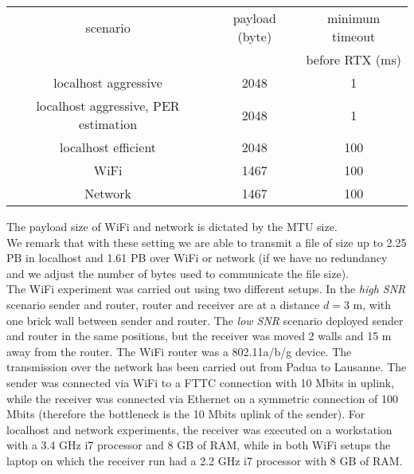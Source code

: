 \begin{center}
\begin{tabular}{ccc}

\toprule
scenario & payload (byte) & minimum timeout\\
 & & before RTX (ms) \\
\midrule
localhost aggressive&2048&1\\
localhost aggressive, PER estimation & 2048 & 1 \\
localhost efficient&2048&100\\
WiFi&1467&100\\
Network&1467&100\\
\bottomrule
\end{tabular}
\end{center}
The payload size of WiFi and network is dictated by the MTU size. \\
We remark that with these setting we are able to transmit a file of size up to 2.25 PB in localhost and 1.61 PB over WiFi or network (if we have no redundancy and we adjust the number of bytes used to communicate the file size).\\
The WiFi experiment was carried out using two different setups. In the \textit{high SNR} scenario sender and router, router and receiver are at a distance $d= 3$ m, with one brick wall between sender and router. The \textit{low SNR} scenario deployed sender and router in the same positions, but the receiver was moved 2 walls and 15 m away from the router. The WiFi router was a 802.11a/b/g device. 
The transmission over the network has been carried out from Padua to Lausanne. The sender was connected via WiFi to a FTTC connection with 10 Mbits in uplink, while the receiver was connected via Ethernet on a symmetric connection of 100 Mbits (therefore the bottleneck is the 10 Mbits uplink of the sender). For localhost and network experiments, the receiver was executed on a workstation with a 3.4 GHz i7 processor and 8 GB of RAM, while in both WiFi setups the laptop on which the receiver run had a 2.2 GHz i7 processor with 8 GB of RAM.

